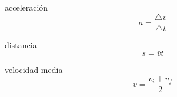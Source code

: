 
acceleración
\[ a=\frac{\triangle{v}}{\triangle{t}} \]

distancia
\[ s=\bar{v}t \]

velocidad media
\[ \bar{v} = \frac{v_i+v_f}{2} \]
